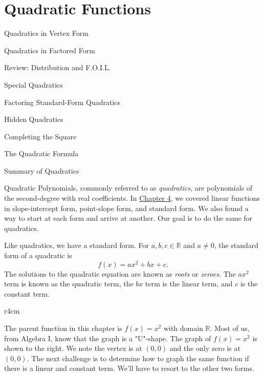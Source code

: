 \documentclass[../book.tex]{subfiles}
\begin{document}
\chapter{Quadratic Functions}
\begin{introduction}[Contents]
\item Quadratics in Vertex Form
\item Quadratics in Factored Form
\item Review: Distribution and F.O.I.L.
\item Special Quadratics
\item Factoring Standard-Form Quadratics
\item Hidden Quadratics
\item Completing the Square
\item The Quadratic Formula
\item Summary of Quadratics
\end{introduction}
\noindent Quadratic Polynomials, commonly referred to as \textit{quadratics}, are polynomials of the second-degree with real coefficients.  In \hyperlink{chapter.4}{Chapter 4}, we covered linear functions in slope-intercept form, point-slope form, and standard form.  We also found a way to start at each form and arrive at another.  Our goal is to do the same for quadratics.

Like quadratics, we have a standard form.  For $a,b,c\in\mathbb{R}$ and $a\neq 0$, the standard form of a quadratic is $$f(x)=ax^2+bx+c.$$  The solutions to the quadratic equation are known as \textit{roots} or \textit{zeroes}.  The $ax^2$ term is known as the quadratic term, the $bx$ term is the linear term, and $c$ is the constant term.
\begin{wrapfigure}{r}{4cm}
\end{wrapfigure}
The parent function in this chapter is $f(x)=x^2$ with domain $\mathbb{R}$.  Most of us, from Algebra I, know that the graph is a "U"-shape.  The graph of $f(x)=x^2$ is shown to the right.  We note the vertex is at $(0,0)$ and the only zero is at $(0,0)$.  The next challenge is to determine how to graph the same function if there is a linear and constant term.  We'll have to resort to the other two forms.
\end{document}
